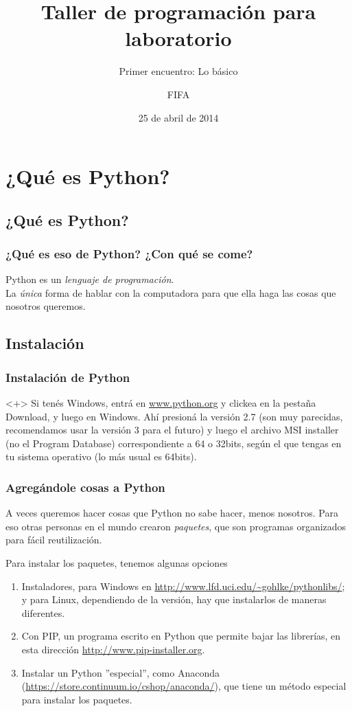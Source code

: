 \documentclass{beamer}
\title{Taller de programación para laboratorio}
\subtitle{Primer encuentro: Lo básico}
\author{FIFA}
\institute[FIFA]{Federación Interestudiantil de Física Argentina}
\date{25 de abril de 2014}
\begin{document}
\begin{frame}
  \titlepage
\end{frame}


\section{¿Qué es Python?}

\subsection{¿Qué es Python?}
\begin{frame}
    \frametitle{¿Qué es eso de Python? ¿Con qué se come?}
    Python es un \emph{lenguaje de programación}.\\ La \emph{única} forma de hablar con la computadora para que ella haga las cosas que nosotros queremos.
\end{frame}

\subsection{Instalación}
\begin{frame}
    \frametitle{Instalación de Python}
    \begin{onlyenv}<+>
    Si tenés Windows, entrá en \url{www.python.org} y clickea en la pestaña Download, y luego en Windows. Ahí presioná la versión 2.7 (son muy parecidas, recomendamos usar la versión 3 para el futuro) y luego el archivo MSI installer (no el Program Database) correspondiente a 64 o 32bits, según el que tengas en tu sistema operativo (lo más usual es 64bits).
    \end{onlyenv}
\end{frame}



\begin{frame}
    \frametitle{Agregándole cosas a Python}
    A veces queremos hacer cosas que Python no sabe hacer, menos nosotros. Para eso otras personas en el mundo crearon \emph{paquetes}, que son programas organizados para fácil reutilización.
    
    Para instalar los paquetes, tenemos algunas opciones
    \begin{enumerate}
    \item{Instaladores, para Windows en \url{http://www.lfd.uci.edu/~gohlke/pythonlibs/}; y para Linux, dependiendo de la versión, hay que instalarlos de maneras diferentes.}
    \item{Con PIP, un programa escrito en Python que permite bajar las librerías, en esta dirección \url{http://www.pip-installer.org}.}
    \item{Instalar un Python ''especial'', como Anaconda (\url{https://store.continuum.io/cshop/anaconda/}), que tiene un método especial para instalar los paquetes.}
    \end{enumerate}

\end{frame}
\end{document}
